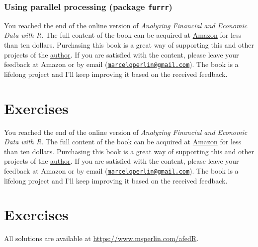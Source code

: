 \documentclass[
  12pt,
]{book}
\newenvironment{pleasebuyit}
{\begin{noteblock}
		
	} {\end{noteblock}}
\begin{document}
\hypertarget{using-parallel-processing-package-furrr}{%
\subsubsection{\texorpdfstring{Using parallel processing (package \texttt{furrr})}{Using parallel processing (package furrr)}}\label{using-parallel-processing-package-furrr}}

\begin{pleasebuyit}
You reached the end of the online version of \emph{Analyzing Financial
and Economic Data with R}. The full content of the book can be acquired
at \href{https://www.amazon.com/dp/B084LSNXMN}{Amazon} for less than ten
dollars. Purchasing this book is a great way of supporting this and
other projects of the \href{https://www.msperlin.com/blog/}{author}. If
you are satisfied with the content, please leave your feedback at Amazon
or by email
(\href{mailto:marceloperlin@gmail.com}{\nolinkurl{marceloperlin@gmail.com}}).
The book is a lifelong project and I'll keep improving it based on the
received feedback.
\end{pleasebuyit}

\hypertarget{exercises-15}{%
\section{Exercises}\label{exercises-15}}

\begin{pleasebuyit}
You reached the end of the online version of \emph{Analyzing Financial
and Economic Data with R}. The full content of the book can be acquired
at \href{https://www.amazon.com/dp/B084LSNXMN}{Amazon} for less than ten
dollars. Purchasing this book is a great way of supporting this and
other projects of the \href{https://www.msperlin.com/blog/}{author}. If
you are satisfied with the content, please leave your feedback at Amazon
or by email
(\href{mailto:marceloperlin@gmail.com}{\nolinkurl{marceloperlin@gmail.com}}).
The book is a lifelong project and I'll keep improving it based on the
received feedback.
\end{pleasebuyit}

\hypertarget{exercises-16}{%
\section{Exercises}\label{exercises-16}}

All solutions are available at \url{https://www.msperlin.com/afedR}.
\end{document}
